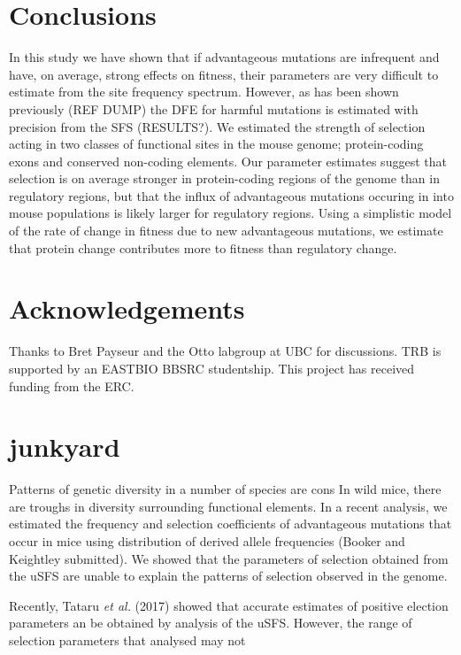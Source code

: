 \documentclass[11pt]{article}
\begin{document}
\section*{Conclusions}

In this study we have shown that if advantageous mutations are infrequent and have, on average, strong effects on fitness, their parameters are very difficult to estimate from the site frequency spectrum. However, as has been shown previously (REF DUMP) the DFE for harmful mutations is estimated with precision from the SFS (RESULTS?). We estimated the strength of selection acting in two classes of functional sites in the mouse genome; protein-coding exons and conserved non-coding elements. Our parameter estimates suggest that selection is on average stronger in protein-coding regions of the genome than in regulatory regions, but that the influx of advantageous mutations occuring in into mouse populations is likely larger for regulatory regions. Using a simplistic model of the rate of change in fitness due to new advantageous mutations, we estimate that protein change contributes more to fitness than regulatory change.

\section*{Acknowledgements}

Thanks to Bret Payseur and the Otto labgroup at UBC for discussions. TRB is supported by an EASTBIO BBSRC studentship. This project has received funding from the ERC.


\section*{junkyard}

Patterns of genetic diversity in a number of species are cons
In wild mice, there are troughs in diversity surrounding functional elements. In a recent analysis, we estimated the frequency and selection coefficients of advantageous mutations that occur in mice using distribution of derived allele frequencies (Booker and Keightley submitted). We showed that the parameters of selection obtained from the uSFS are unable to explain the patterns of selection observed in the genome.

Recently, Tataru \textit{et al.} (2017) showed that accurate estimates of positive election parameters an be obtained by analysis of the uSFS. However, the range of selection parameters that analysed may not
\end{document}
